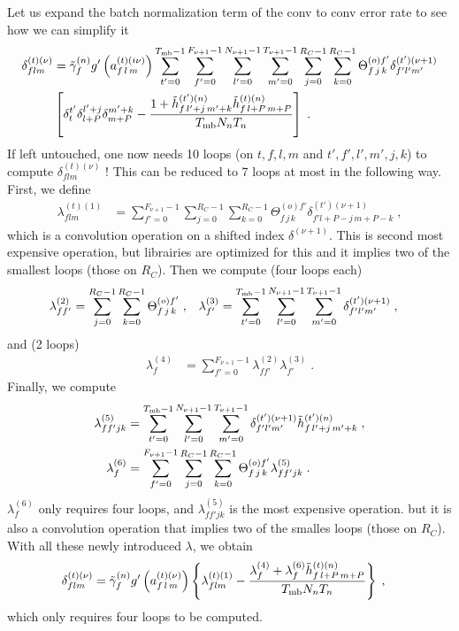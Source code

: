 \begin{subappendices}
Let us expand the batch normalization term of the conv to conv error rate to see how we can simplify it
\begin{align}
\delta^{(t)(\nu)}_{flm}&=\tilde{\gamma}^{(n)}_fg'\left(a_{f\,l\,m}^{(t)(i\nu)}\right)
%
\sum_{t'=0}^{T_{{\rm mb}}-1}\sum^{F_{\nu+1}-1}_{f'=0}\sum^{N_{\nu+1}-1}_{l'=0}\sum^{T_{\nu+1}-1}_{m'=0}
%
\sum^{R_C-1}_{j=0}\sum^{R_C-1}_{k=0}\Theta^{(o)f'}_{f\,j\,k}\delta_{f'l'm'}^{(t')(\nu+1)}\notag\\
%
&\left[\delta^{t'}_t\delta^{ l'+j}_{l+P}\delta^{m'+k}_{m+P}-
%
\frac{1+\tilde{h}_{f\, l'+j\,m'+k}^{(t')(n)}\tilde{h}_{f\,l+P\,m+P}^{(t)(n)}}{T_{{\rm mb}}N_nT_n}\right]\;.
\end{align}
If left untouched, one now needs 10 loops (on $t,f,l,m$ and $t',f',l',m',j,k$) to compute $\delta^{(t)(\nu)}_{flm}$ ! This can be reduced to 7 loops at most in the following way. First, we define
\begin{align}
\lambda^{(t)(1)}_{flm}&=\sum^{F_{\nu+1}-1}_{f'=0}\sum^{R_C-1}_{j=0}\sum^{R_C-1}_{k=0}
%
\Theta^{(o)f'}_{f\,j\,k}\delta_{f'l+P-j\,m+P-k}^{(t')(\nu+1)}\;,
\end{align}
which is a convolution operation on a shifted index $\delta^{(\nu+1)}$. This is second most expensive operation, but librairies are optimized for this and it implies two of the smallest loops (those on $R_C$). Then we compute (four loops each)
\begin{align}
\lambda^{(2)}_{ff'}&=\sum^{R_C-1}_{j=0}\sum^{R_C-1}_{k=0}\Theta^{(o)f'}_{f\,j\,k}\;,&
%
\lambda^{(3)}_{f'}&=\sum_{t'=0}^{T_{{\rm mb}}-1}\sum^{N_{\nu+1}-1}_{l'=0}\sum^{T_{\nu+1}-1}_{m'=0}
%
\delta_{f'l'm'}^{(t')(\nu+1)}\;,
\end{align}
and (2 loops)
\begin{align}
\lambda^{(4)}_{f}&=\sum^{F_{\nu+1}-1}_{f'=0}\lambda^{(2)}_{ff'}\lambda^{(3)}_{f'}\;.
\end{align}
Finally, we compute
\begin{align}
\lambda^{(5)}_{ff'jk}&=\sum_{t'=0}^{T_{{\rm mb}}-1}\sum^{N_{\nu+1}-1}_{l'=0}\sum^{T_{\nu+1}-1}_{m'=0}
%
\delta_{f'l'm'}^{(t')(\nu+1)}\tilde{h}_{f\, l'+j\,m'+k}^{(t')(n)}\;,\\
%
\lambda^{(6)}_{f}&=\sum^{F_{\nu+1}-1}_{f'=0}\sum^{R_C-1}_{j=0}\sum^{R_C-1}_{k=0}
%
\Theta^{(o)f'}_{f\,j\,k}\lambda^{(5)}_{ff'jk}\;.
\end{align}
$\lambda^{(6)}_{f}$ only requires four loops, and $\lambda^{(5)}_{ff'jk}$ is the  most expensive operation. but it is also a convolution operation that implies two of the smalles loops (those on $R_C$). With all these newly introduced $\lambda$, we obtain
\begin{align}
\delta^{(t)(\nu)}_{flm}&=\tilde{\gamma}^{(n)}_fg'\left(a_{f\,l\,m}^{(t)(\nu)}\right)\left\{
%
\lambda^{(t)(1)}_{flm}-
%
\frac{\lambda^{(4)}_{f}+\lambda^{(6)}_{f}\tilde{h}_{f\,l+P\,m+P}^{(t)(n)}}{T_{{\rm mb}}N_nT_n}\right\}\;,
\end{align}
which only requires four loops to be computed.


\end{subappendices}
